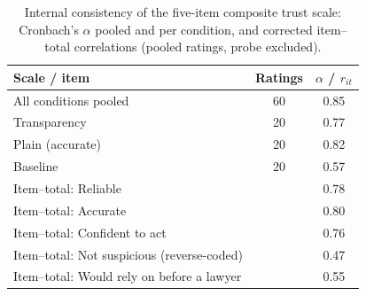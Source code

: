 \begin{table}[H]
\centering
\caption{Internal consistency of the five-item composite trust scale: Cronbach's $\alpha$ pooled and per condition, and corrected item--total correlations (pooled ratings, probe excluded).}
\label{tab:us-reliability}
{\footnotesize{}\setlength{\tabcolsep}{4pt}
\begin{tabular}{lcc}
\toprule
\textbf{Scale / item} & \textbf{Ratings} & \textbf{$\alpha$ / $r_{it}$} \\
\midrule
All conditions pooled & 60 & 0.85 \\
Transparency & 20 & 0.77 \\
Plain (accurate) & 20 & 0.82 \\
Baseline & 20 & 0.57 \\
Item--total: Reliable &  & 0.78 \\
Item--total: Accurate &  & 0.80 \\
Item--total: Confident to act &  & 0.76 \\
Item--total: Not suspicious (reverse-coded) &  & 0.47 \\
Item--total: Would rely on before a lawyer &  & 0.55 \\
\bottomrule
\end{tabular}
}
\end{table}
